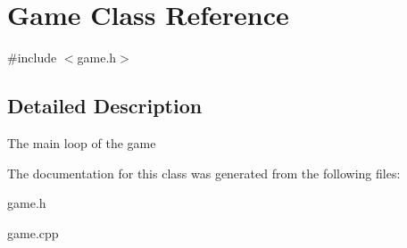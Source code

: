 \hypertarget{class_game}{\section{Game Class Reference}
\label{class_game}
}


{\ttfamily \#include $<$game.\-h$>$}



\subsection{Detailed Description}
The main loop of the game 

The documentation for this class was generated from the following files\-:\begin{DoxyCompactItemize}
\item 
game.\-h\item 
game.\-cpp\end{DoxyCompactItemize}
